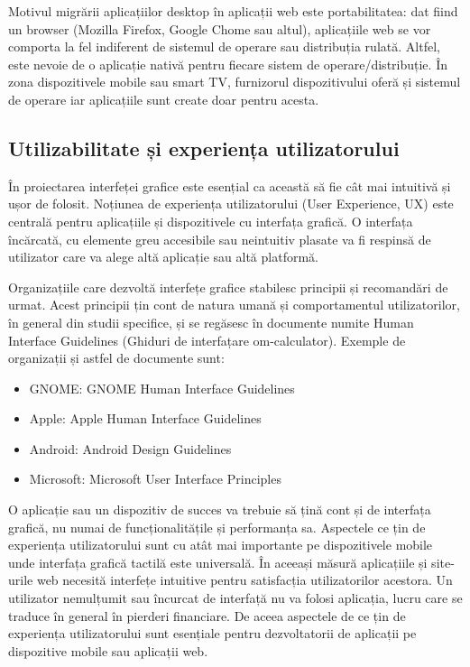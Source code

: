 Motivul migrării aplicațiilor desktop în aplicații web este portabilitatea: dat fiind un browser (Mozilla Firefox, Google Chome sau altul), aplicațiile web se vor comporta la fel indiferent de sistemul de operare sau distribuția rulată. Altfel, este nevoie de o aplicație nativă pentru fiecare sistem de operare/distribuție. În zona dispozitivele mobile sau smart TV, furnizorul dispozitivului oferă și sistemul de operare iar aplicațiile sunt create doar pentru acesta.

\subsection{Utilizabilitate și experiența utilizatorului}
\label{sec:ui:ux}

În proiectarea interfeței grafice este esențial ca această să fie cât mai intuitivă și ușor de folosit. Noțiunea de experiența utilizatorului (User Experience, UX) este centrală pentru aplicațiile și dispozitivele cu interfața grafică. O interfața încărcată, cu elemente greu accesibile sau neintuitiv plasate va fi respinsă de utilizator care va alege altă aplicație sau altă platformă.

Organizațiile care dezvoltă interfețe grafice stabilesc principii și recomandări de urmat. Acest principii țin cont de natura umană și comportamentul utilizatorilor, în general din studii specifice, și se regăsesc în documente numite Human Interface Guidelines (Ghiduri de interfațare om-calculator). Exemple de organizații și astfel de documente sunt:

\begin{itemize}
  \item GNOME: GNOME Human Interface Guidelines
  \item Apple: Apple Human Interface Guidelines
  \item Android: Android Design Guidelines
  \item Microsoft: Microsoft User Interface Principles
\end{itemize}

O aplicație sau un dispozitiv de succes va trebuie să țină cont și de interfața grafică, nu numai de funcționalitățile și performanța sa. Aspectele ce țin de experiența utilizatorului sunt cu atât mai importante pe dispozitivele mobile unde interfața grafică tactilă este universală. În aceeași măsură aplicațiile și site-urile web necesită interfețe intuitive pentru satisfacția utilizatorilor acestora. Un utilizator nemulțumit sau încurcat de interfață nu va folosi aplicația, lucru care se traduce în general în pierderi financiare. De aceea aspectele de ce țin de experiența utilizatorului sunt esențiale pentru dezvoltatorii de aplicații pe dispozitive mobile sau aplicații web.

